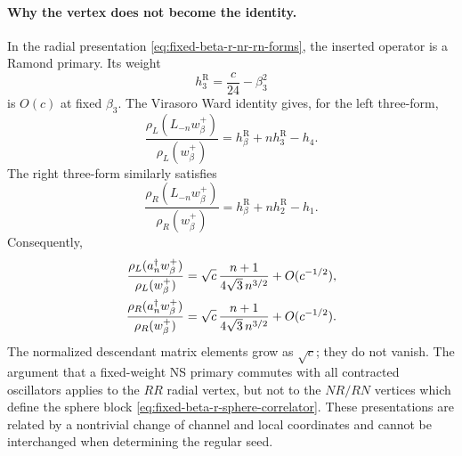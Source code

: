 \documentclass[11pt]{article}
\newcommand{\R}{\mathrm{R}}
\begin{document}
\paragraph{Why the vertex does not become the identity.}
In the radial presentation
\eqref{eq:fixed-beta-r-nr-rn-forms}, the inserted operator is a Ramond
primary.  Its weight
\begin{equation}
 h_3^{\R}=\frac c{24}-\beta_3^2
 \end{equation}
is \(O(c)\) at fixed \(\beta_3\).  The Virasoro Ward identity gives, for
the left three-form,
\begin{equation}
 \frac{\rho_L(L_{-n}w_\beta^+)}{\rho_L(w_\beta^+)}
 =
 h_\beta^{\R}+n h_3^{\R}-h_4.
 \label{eq:fixed-beta-r-left-vir-ward}
\end{equation}
The right three-form similarly satisfies
\begin{equation}
 \frac{\rho_R(L_{-n}w_\beta^+)}{\rho_R(w_\beta^+)}
 =
 h_\beta^{\R}+n h_2^{\R}-h_1.
 \label{eq:fixed-beta-r-right-vir-ward}
\end{equation}
Consequently,
\begin{align}
 \frac{\rho_L(a_n^\dagger w_\beta^+)}{\rho_L(w_\beta^+)}
 &=
 \sqrt c\,
 \frac{n+1}{4\sqrt3\,n^{3/2}}
 +O(c^{-1/2}),
 \notag\\
 \frac{\rho_R(a_n^\dagger w_\beta^+)}{\rho_R(w_\beta^+)}
 &=
 \sqrt c\,
 \frac{n+1}{4\sqrt3\,n^{3/2}}
 +O(c^{-1/2}).
 \label{eq:fixed-beta-r-coherent-source}
\end{align}
The normalized descendant matrix elements grow as \(\sqrt c\); they do
not vanish.  The argument that a fixed-weight NS primary commutes with all
contracted oscillators applies to the \(RR\) radial vertex, but not to the
\(NR/RN\) vertices which define the sphere block
\eqref{eq:fixed-beta-r-sphere-correlator}.  These presentations are related
by a nontrivial change of channel and local coordinates and cannot be
interchanged when determining the regular seed.
\end{document}
